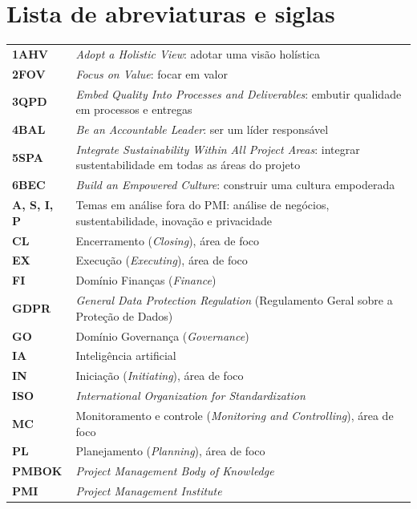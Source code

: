\documentclass[11pt,a4paper]{article}
\begin{document}
\section*{Lista de abreviaturas e siglas}
\small
\begin{longtable}{@{}>{\raggedright\arraybackslash}p{2.6cm}>{\raggedright\arraybackslash}p{\dimexpr\linewidth-2.6cm-2\tabcolsep\relax}@{}}
\textbf{1AHV} & \textit{Adopt a Holistic View}: adotar uma visão holística\\[2pt]
\textbf{2FOV} & \textit{Focus on Value}: focar em valor\\[2pt]
\textbf{3QPD} & \textit{Embed Quality Into Processes and Deliverables}: embutir qualidade em processos e entregas\\[2pt]
\textbf{4BAL} & \textit{Be an Accountable Leader}: ser um líder responsável\\[2pt]
\textbf{5SPA} & \textit{Integrate Sustainability Within All Project Areas}: integrar sustentabilidade em todas as áreas do projeto\\[2pt]
\textbf{6BEC} & \textit{Build an Empowered Culture}: construir uma cultura empoderada\\[2pt]
\textbf{A, S, I, P} & Temas em análise fora do PMI: análise de negócios, sustentabilidade, inovação e privacidade\\[2pt]
\textbf{CL} & Encerramento (\textit{Closing}), área de foco\\[2pt]
\textbf{EX} & Execução (\textit{Executing}), área de foco\\[2pt]
\textbf{FI} & Domínio Finanças (\textit{Finance})\\[2pt]
\textbf{GDPR} & \textit{General Data Protection Regulation} (Regulamento Geral sobre a Proteção de Dados)\\[2pt]
\textbf{GO} & Domínio Governança (\textit{Governance})\\[2pt]
\textbf{IA} & Inteligência artificial\\[2pt]
\textbf{IN} & Iniciação (\textit{Initiating}), área de foco\\[2pt]
\textbf{ISO} & \textit{International Organization for Standardization}\\[2pt]
\textbf{MC} & Monitoramento e controle (\textit{Monitoring and Controlling}), área de foco\\[2pt]
\textbf{PL} & Planejamento (\textit{Planning}), área de foco\\[2pt]
\textbf{PMBOK} & \textit{Project Management Body of Knowledge}\\[2pt]
\textbf{PMI} & \textit{Project Management Institute}\\[2pt]

\end{longtable}
\end{document}
